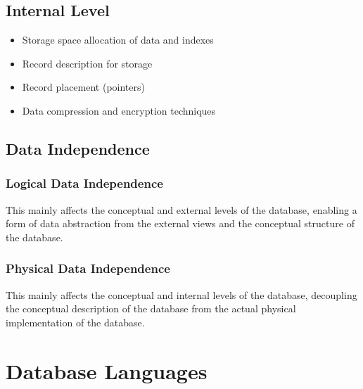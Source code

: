 \documentclass[12pt letter]{report}
\begin{document}
\subsection{Internal Level}


\begin{itemize}
  \item Storage space allocation of data and indexes
  \item Record description for storage
  \item Record placement (pointers)
  \item Data compression and encryption techniques
\end{itemize}


\subsection{Data Independence}
\subsubsection{Logical Data Independence}

This mainly affects the conceptual and external levels of the database, enabling a form of data abstraction from the
external views and the conceptual structure of the database.

\subsubsection{Physical Data Independence}

This mainly affects the conceptual and internal levels of the database, decoupling the conceptual description of the
database from the actual physical implementation of the database.


\section{Database Languages}
\end{document}
